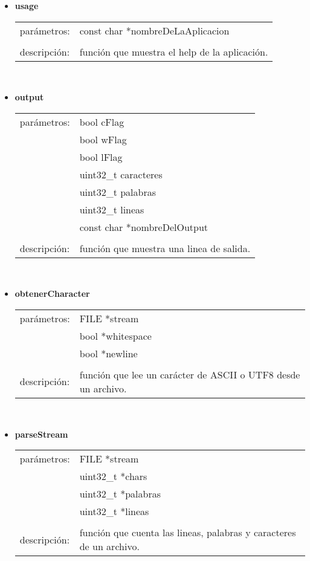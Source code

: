 \documentclass[a4paper]{article}
\begin{document}
\begin{itemize}
\item \textbf{usage}\\
	\begin{tabular}{ll}
    parámetros: &const char *nombreDeLaAplicacion\\
    &\\
    descripción: &función que muestra el help de la aplicación.
    \end{tabular}\\

\item \textbf{output}\\
	\begin{tabular}{ll}
    parámetros:    &bool cFlag\\
                   &bool wFlag\\
                   &bool lFlag\\
                   &uint32\_t caracteres\\
                   &uint32\_t palabras\\
                   &uint32\_t lineas\\
                   &const char *nombreDelOutput\\
	&\\
    descripción: &función que muestra una linea de salida.
    \end{tabular}\\

\item \textbf{obtenerCharacter}\\
	\begin{tabular}{ll}
    parámetros:    &FILE *stream\\
                   &bool *whitespace\\
                   &bool *newline\\
    &\\
    descripción: &función que lee un carácter de ASCII o UTF8 desde un archivo.
    \end{tabular}\\

\item \textbf{parseStream}\\
	\begin{tabular}{ll}
    parámetros:     &FILE *stream\\
    				&uint32\_t *chars\\
                    &uint32\_t *palabras\\
                    &uint32\_t *lineas\\
    &\\
    descripción: &función que cuenta las lineas, palabras y caracteres de un archivo.
    \end{tabular}\\
\end{itemize}
\lstset{basicstyle=\footnotesize\ttfamily}
\pagebreak
\end{document}

